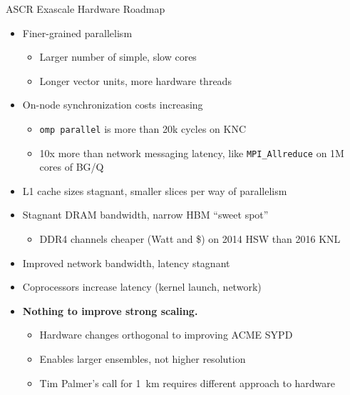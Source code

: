 \documentclass{beamer}
\begin{document}
\begin{frame}{ASCR Exascale Hardware Roadmap}
  \begin{itemize}
  \item Finer-grained parallelism
    \begin{itemize}
    \item Larger number of simple, slow cores
    \item Longer vector units, more hardware threads
    \end{itemize}
  \item On-node synchronization costs increasing
    \begin{itemize}
    \item \texttt{omp parallel} is more than 20k cycles on KNC
    \item 10x more than network messaging latency, like \texttt{MPI\_Allreduce} on 1M cores of BG/Q
    \end{itemize}
  \item L1 cache sizes stagnant, smaller slices per way of parallelism
  \item Stagnant DRAM bandwidth, narrow HBM ``sweet spot''
    \begin{itemize}
    \item DDR4 channels cheaper (Watt and \$) on 2014 HSW than 2016 KNL
    \end{itemize}
  \item Improved network bandwidth, latency stagnant
  \item Coprocessors increase latency (kernel launch, network)
  \item \alert{\bf Nothing to improve strong scaling.}
    \begin{itemize}
    \item Hardware changes orthogonal to improving ACME SYPD
    \item Enables larger ensembles, not higher resolution
    \item Tim Palmer's call for \SI{1}{\kilo\metre} requires different approach to hardware
    \end{itemize}
  \end{itemize}
\end{frame}
\end{document}
